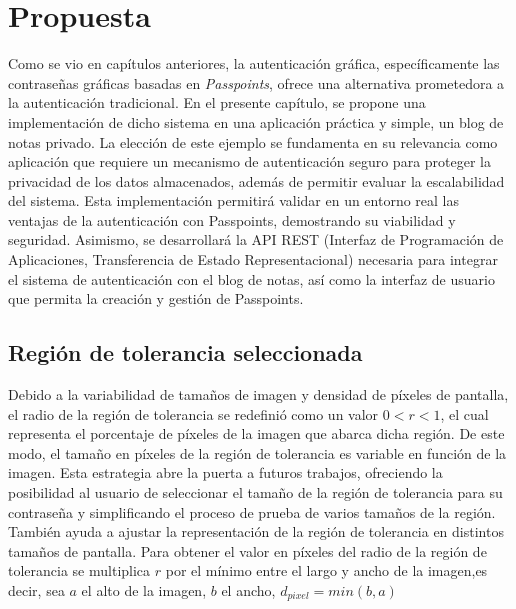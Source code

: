 \chapter{Propuesta}\label{chapter:proposal}
Como se vio en capítulos anteriores, la autenticación gráfica, específicamente las contraseñas gráficas basadas en \textit{Passpoints}, ofrece una alternativa prometedora a la autenticación tradicional. En el presente capítulo, se propone una implementación de dicho sistema en una aplicación práctica y simple, un blog de notas privado. La elección de este ejemplo se fundamenta en su relevancia como aplicación que requiere un mecanismo de autenticación seguro para proteger la privacidad de los datos almacenados, además de permitir evaluar la escalabilidad del sistema. Esta implementación permitirá validar en un entorno real las ventajas de la autenticación con Passpoints, demostrando su viabilidad y seguridad. Asimismo, se desarrollará la API REST (Interfaz de Programación de Aplicaciones, Transferencia de Estado Representacional) necesaria para integrar el sistema de autenticación con el blog de notas, así como la interfaz de usuario que permita la creación y gestión de Passpoints.



\section{Regi\'on de tolerancia seleccionada}

Debido a la variabilidad de tamaños de imagen y densidad de píxeles de pantalla, el radio de la región de tolerancia se redefinió como un valor $0 < r < 1$, el cual representa el porcentaje de píxeles de la imagen que abarca dicha región. De este modo, el tamaño en píxeles de la región de tolerancia es variable en función de la imagen. Esta estrategia abre la puerta a futuros trabajos, ofreciendo la posibilidad al usuario de seleccionar el tamaño de la región de tolerancia para su contraseña y simplificando el proceso de prueba de varios tamaños de la región. Tambi\'en ayuda a ajustar la representaci\'on de la regi\'on de tolerancia en distintos tama\~nos de pantalla. Para obtener el valor en píxeles del radio de la región de tolerancia se multiplica $r$ por el mínimo entre el largo y ancho de la imagen,es decir, sea $a$ el alto de la imagen, $b$ el ancho, $d_{pixel} = min(b,a)$ 

